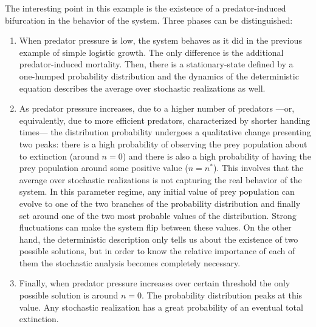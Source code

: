 The interesting point in this example is the existence of a predator-induced bifurcation in the behavior of the system. Three phases can be distinguished:
\begin{enumerate}
\item When predator pressure is low, the system behaves as it did in the previous example of simple logistic growth. The only difference is the additional predator-induced mortality. Then, there is a stationary-state defined by a one-humped probability distribution and the dynamics of the deterministic equation describes the average over stochastic realizations as well. 
\item As predator pressure increases, due to a higher number of predators ---or, equivalently, due to more efficient predators, characterized by shorter handing times--- the distribution probability undergoes a qualitative change presenting two peaks: there is a high probability of observing the prey population about to extinction (around $n=0$) and there is also a high probability of having the prey population around some positive value ($n=n^{*}$). This involves that the average over stochastic realizations is not capturing the real behavior of the system. In this parameter regime, any initial value of prey population can evolve to one of the two branches of the probability distribution and finally set around one of the two most probable values of the distribution. Strong fluctuations can make the system flip between these values. On the other hand, the deterministic description only tells us about the existence of two possible solutions, but in order to know the relative importance of each of them the stochastic analysis becomes completely necessary.  
\item Finally, when predator pressure increases over certain threshold the only possible solution is around $n=0$. The probability distribution peaks at this value. Any stochastic realization has a great probability of an eventual total extinction.
\end{enumerate}
\smallskip 

